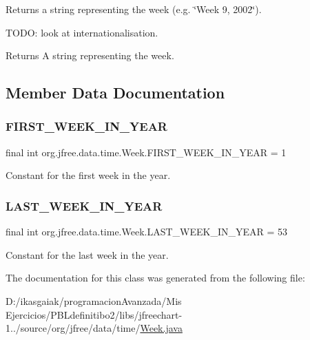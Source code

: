 Returns a string representing the week (e.\+g. \char`\"{}\+Week 9, 2002\char`\"{}).

T\+O\+DO\+: look at internationalisation.

\begin{DoxyReturn}{Returns}
A string representing the week. 
\end{DoxyReturn}


\subsection{Member Data Documentation}
\mbox{\label{classorg_1_1jfree_1_1data_1_1time_1_1_week_a4bf0ee927fde0f700b2ca12ae78ab93f}} 
\subsubsection{\texorpdfstring{F\+I\+R\+S\+T\+\_\+\+W\+E\+E\+K\+\_\+\+I\+N\+\_\+\+Y\+E\+AR}{FIRST\_WEEK\_IN\_YEAR}}
{\footnotesize\ttfamily final int org.\+jfree.\+data.\+time.\+Week.\+F\+I\+R\+S\+T\+\_\+\+W\+E\+E\+K\+\_\+\+I\+N\+\_\+\+Y\+E\+AR = 1\hspace{0.3cm}{\ttfamily [static]}}

Constant for the first week in the year. \mbox{\label{classorg_1_1jfree_1_1data_1_1time_1_1_week_a3c468be77dbf7b123d0f38e232ca8b12}} 
\subsubsection{\texorpdfstring{L\+A\+S\+T\+\_\+\+W\+E\+E\+K\+\_\+\+I\+N\+\_\+\+Y\+E\+AR}{LAST\_WEEK\_IN\_YEAR}}
{\footnotesize\ttfamily final int org.\+jfree.\+data.\+time.\+Week.\+L\+A\+S\+T\+\_\+\+W\+E\+E\+K\+\_\+\+I\+N\+\_\+\+Y\+E\+AR = 53\hspace{0.3cm}{\ttfamily [static]}}

Constant for the last week in the year. 

The documentation for this class was generated from the following file\+:\begin{DoxyCompactItemize}
\item 
D\+:/ikasgaiak/programacion\+Avanzada/\+Mis Ejercicios/\+P\+B\+Ldefinitibo2/libs/jfreechart-\/1../source/org/jfree/data/time/\mbox{\hyperlink{_week_8java}{Week.\+java}}\end{DoxyCompactItemize}
